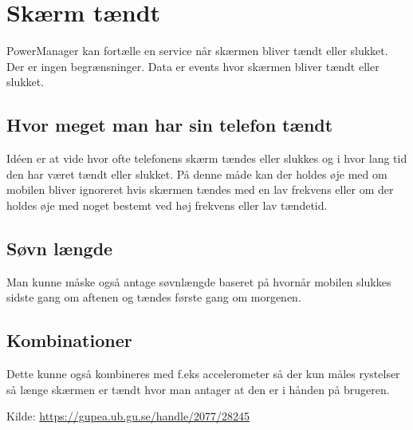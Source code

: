 \section{Skærm tændt}
PowerManager kan fortælle en service når skærmen bliver tændt eller slukket. Der er ingen begrænsninger. Data er events hvor skærmen bliver tændt eller slukket.

\subsection{Hvor meget man har sin telefon tændt}
Idéen er at vide hvor ofte telefonens skærm tændes eller slukkes og i hvor lang tid den har været tændt eller slukket. På denne måde kan der holdes øje med om mobilen bliver ignoreret hvis skærmen tændes med en lav frekvens eller om der holdes øje med noget bestemt ved høj frekvens eller lav tændetid. 

\subsection{Søvn længde}
Man kunne måske også antage søvnlængde baseret på hvornår mobilen slukkes sidste gang om aftenen og tændes første gang om morgenen. 

\subsection{Kombinationer}
Dette kunne også kombineres med f.eks accelerometer så der kun måles rystelser så længe skærmen er tændt hvor man antager at den er i hånden på brugeren.

Kilde: \url{https://gupea.ub.gu.se/handle/2077/28245}

